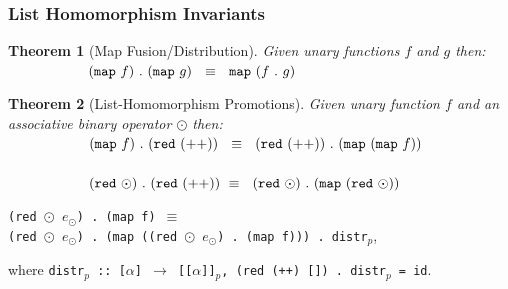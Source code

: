 \documentclass{beamer}
\newtheorem{mytheo}{Theorem}
\begin{document}
\begin{frame}[fragile,t]
  \frametitle{List Homomorphism Invariants}

\begin{mytheo}[Map Fusion/Distribution]\label{Fusion}\vspace{-2ex}
Given unary functions $f$ and $g$ then: \\
$\mbox{ }\mbox{ }\mbox{ }\mbox{ }\mbox{ }\mbox{ }\mbox{ }\mbox{ }$
$({\tt map}~f)~.~({\tt map}~g) \mbox{ }\mbox{ }\equiv\mbox{ }\mbox{ }{\tt map}~(f~{\tt{}.}~g)$ \\
\end{mytheo}


\begin{mytheo}[List-Homomorphism Promotions]\label{LHomInv}\vspace{-2ex}
Given unary function $f$ and an associative binary operator $\odot$ then: \\
$\mbox{ }\mbox{ }\mbox{ }\mbox{ }\mbox{ }\mbox{ }\mbox{ }\mbox{ }$
$({\tt map} \mbox{ }f)\mbox{ }.\mbox{ }({\tt red}\mbox{ }({\tt ++})) \mbox{ }\mbox{ }\equiv\mbox{ }\mbox{ }({\tt red}\mbox{ }({\tt ++}))\mbox{ }.\mbox{ }({\tt map}\mbox{ }({\tt map}\mbox{ }f) )$ \\
$\mbox{ }$ \\
$\mbox{ }\mbox{ }\mbox{ }\mbox{ }\mbox{ }\mbox{ }\mbox{ }\mbox{ }$
$({\tt red}\mbox{ }\odot)\mbox{ }.\mbox{ }({\tt red}\mbox{ }(++)) \mbox{ }\equiv\mbox{ }\mbox{ }({\tt red}\mbox{ }\odot)\mbox{ }.\mbox{ }({\tt map}\mbox{ }({\tt red}\mbox{ }\odot) )$
\end{mytheo}

\bigskip
{\tt (red $\odot$ $e_\odot$) . (map f) $\equiv$ \\
(red~$\odot$~$e_\odot$)~.~(map ((red $\odot$ $e_\odot$)~.~(map f)))~.~distr$_p$},

\smallskip
where {\tt distr$_p$~::~[$\alpha$]~$\rightarrow$~[[$\alpha$]]$_p$, (red~(++)~[])~.~distr$_p$~=~id}. 

\end{frame}
\end{document}
